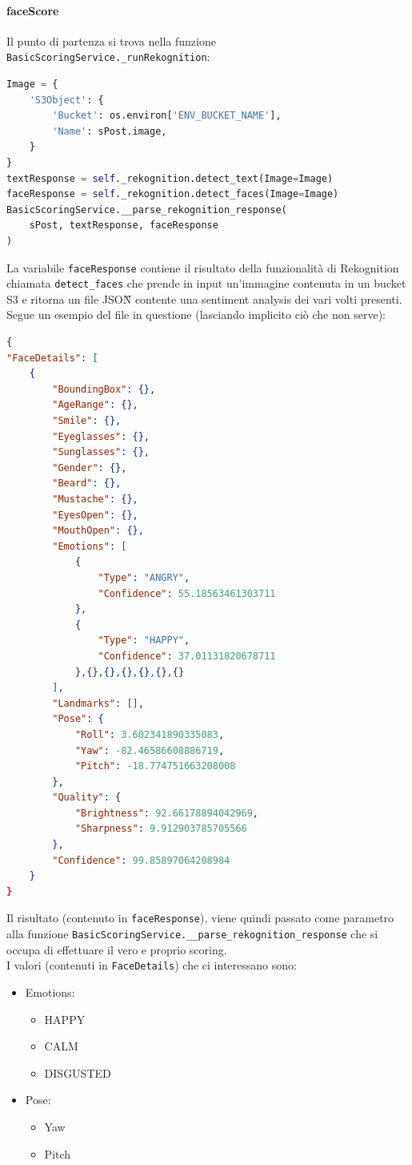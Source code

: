 \paragraph{faceScore} \aCapo
Il punto di partenza si trova nella funzione \verb+BasicScoringService._runRekognition+:
\begin{lstlisting}[language=Python]
Image = {
    'S3Object': {
        'Bucket': os.environ['ENV_BUCKET_NAME'],
        'Name': sPost.image,
    }
}
textResponse = self._rekognition.detect_text(Image=Image)
faceResponse = self._rekognition.detect_faces(Image=Image)
BasicScoringService.__parse_rekognition_response(
    sPost, textResponse, faceResponse
)
\end{lstlisting}
La variabile \verb+faceResponse+ contiene il risultato della funzionalità
di Rekognition chiamata \verb+detect_faces+ che prende in input un'immagine contenuta
in un bucket S3 e ritorna un file JSON\G{} contente una sentiment analysis dei vari volti presenti.\\
Segue un esempio del file in questione (lasciando implicito ciò che non serve):
\begin{lstlisting}[language=JSON]
{
"FaceDetails": [
    {
        "BoundingBox": {},
        "AgeRange": {},
        "Smile": {},
        "Eyeglasses": {},
        "Sunglasses": {},
        "Gender": {},
        "Beard": {},
        "Mustache": {},
        "EyesOpen": {},
        "MouthOpen": {},
        "Emotions": [
            {
                "Type": "ANGRY",
                "Confidence": 55.18563461303711
            },
            {
                "Type": "HAPPY",
                "Confidence": 37.01131820678711
            },{},{},{},{},{},{}
        ],
        "Landmarks": [],
        "Pose": {
            "Roll": 3.602341890335083,
            "Yaw": -82.46586608886719,
            "Pitch": -18.774751663208008
        },
        "Quality": {
            "Brightness": 92.66178894042969,
            "Sharpness": 9.912903785705566
        },
        "Confidence": 99.85897064208984
    }
}
\end{lstlisting}
Il risultato (contenuto in \verb+faceResponse+), viene quindi passato come parametro alla funzione 
\verb+BasicScoringService.__parse_rekognition_response+ che si occupa di effettuare il vero
e proprio scoring.\\
I valori (contenuti in \verb+FaceDetails+) che ci interessano sono:
\begin{itemize}
    \item Emotions: \begin{itemize}
        \item HAPPY
        \item CALM
        \item DISGUSTED \end{itemize}
    \item Pose: \begin{itemize}
        \item Yaw
        \item Pitch \end{itemize}
\end{itemize}
